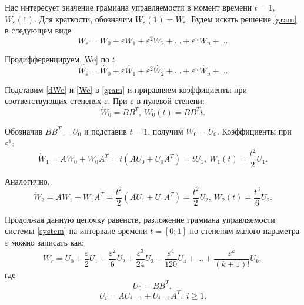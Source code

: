 \documentclass[../main.tex]{subfiles}
\begin{document}
Нас интересует значение грамиана управляемости в момент времени $ t = 1$, $ W_{\varepsilon}(1) $. Для краткости, обозначим $ W_{\varepsilon}(1) = W_{\varepsilon} $.
Будем искать решение \eqref{gram} в следующем виде
\begin{equation}\label{We}
	W_{\varepsilon} = W_0 + \varepsilon W_1 + \varepsilon^2 W_2 + \dots + \varepsilon^n W_n + \dots 
\end{equation}

Продифференцируем \eqref{We} по $ t $
\begin{equation}\label{dWe}
	\dot{W_{\varepsilon}} = \dot{W_0} + \varepsilon \dot{W_1} + \varepsilon^2 \dot{W_2} + \dots + \varepsilon^n \dot{W_n} + \dots 
\end{equation}

Подставим \eqref{dWe} и \eqref{We} в \eqref{gram} и приравняем коэффициенты при соответствующих степенях $ \varepsilon $. При $ \varepsilon $ в нулевой степени:
\begin{equation*}
	\dot{W}_0 = B B ^T,  \ W_0(t) = B B ^Tt.
\end{equation*}

Обозначив $ B B^T = U_0 $ и подставив $ t = 1$, получим $ W_0 = U_0$. Коэффициенты при $ \varepsilon ^ 1$:
\begin{equation*}
	\dot{W}_1 = A W_0 + W_0 A^T = t \left( A U_0 + U_0 A^T \right) = t U_1 ,  \ W_1(t) = \frac{t^2}{2}U_1.
\end{equation*}

Аналогично,
\begin{equation*}
	\dot{W}_2 = A W_1 + W_1 A^T = \dfrac{t^2}{2} \left( A U_1 + U_1 A^T \right) = \dfrac{t^2}{2} U_2 ,  \ W_2(t) = \dfrac{t^3}{6}U_2.
\end{equation*}

Продолжая данную цепочку равенств, разложение грамиана управляемости системы \eqref{system} на интервале времени $t = [0;1] $ по степеням малого параметра $ \varepsilon $ можно записать как:
\begin{equation}\label{gram1}
	W_{\varepsilon} = U_0 + \dfrac{\varepsilon}{2}U_1 + \dfrac{\varepsilon^2}{6} U_2 + \dfrac{\varepsilon^3}{24}U_3 + \dfrac{\varepsilon^4}{120}U_4 + \dots + \dfrac{\varepsilon^k}{(k+1)!}U_k,
\end{equation}
где
\begin{equation*}
	U_0 = B B^T,
\end{equation*}
\begin{equation*}
	U_i  = A U_{i-1} + U_{i-1} A^T, \ i \geq 1.
\end{equation*}
\end{document}

